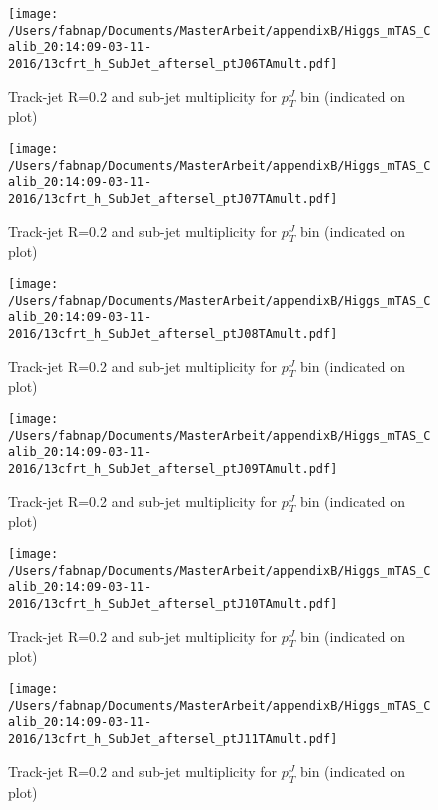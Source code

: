 \begin{figure}
 
\texttt{[image: /Users/fabnap/Documents/MasterArbeit/appendixB/Higgs\_mTAS\_Calib\_20:14:09-03-11-2016/13cfrt\_h\_SubJet\_aftersel\_ptJ06TAmult.pdf]}
\caption{Track-jet R=0.2 and sub-jet multiplicity for $p_{T}^{J}$ bin (indicated on plot) }
 
\end{figure}
\begin{figure}
 
\texttt{[image: /Users/fabnap/Documents/MasterArbeit/appendixB/Higgs\_mTAS\_Calib\_20:14:09-03-11-2016/13cfrt\_h\_SubJet\_aftersel\_ptJ07TAmult.pdf]}
\caption{Track-jet R=0.2 and sub-jet multiplicity for $p_{T}^{J}$ bin (indicated on plot) }
 
\end{figure}
 
\begin{figure}
 
\texttt{[image: /Users/fabnap/Documents/MasterArbeit/appendixB/Higgs\_mTAS\_Calib\_20:14:09-03-11-2016/13cfrt\_h\_SubJet\_aftersel\_ptJ08TAmult.pdf]}
\caption{Track-jet R=0.2 and sub-jet multiplicity for $p_{T}^{J}$ bin (indicated on plot) }
 
\end{figure}

\begin{figure}

\texttt{[image: /Users/fabnap/Documents/MasterArbeit/appendixB/Higgs\_mTAS\_Calib\_20:14:09-03-11-2016/13cfrt\_h\_SubJet\_aftersel\_ptJ09TAmult.pdf]}
\caption{Track-jet R=0.2 and sub-jet multiplicity for $p_{T}^{J}$ bin (indicated on plot) }
 
\end{figure}
 
\begin{figure}

\texttt{[image: /Users/fabnap/Documents/MasterArbeit/appendixB/Higgs\_mTAS\_Calib\_20:14:09-03-11-2016/13cfrt\_h\_SubJet\_aftersel\_ptJ10TAmult.pdf]}
\caption{Track-jet R=0.2 and sub-jet multiplicity for $p_{T}^{J}$ bin (indicated on plot) }

\end{figure}

\begin{figure}

\texttt{[image: /Users/fabnap/Documents/MasterArbeit/appendixB/Higgs\_mTAS\_Calib\_20:14:09-03-11-2016/13cfrt\_h\_SubJet\_aftersel\_ptJ11TAmult.pdf]}
\caption{Track-jet R=0.2 and sub-jet multiplicity for $p_{T}^{J}$ bin (indicated on plot) }

\end{figure}

